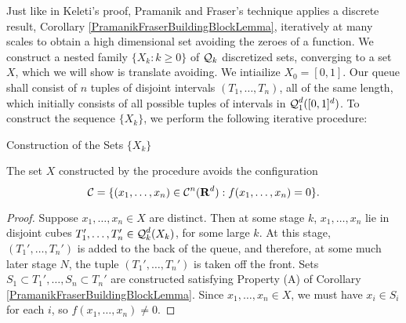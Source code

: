 Just like in Keleti's proof, Pramanik and Fraser's technique applies a discrete result, Corollary \ref{PramanikFraserBuildingBlockLemma}, iteratively at many scales to obtain a high dimensional set avoiding the zeroes of a function. We construct a nested family $\{ X_k : k \geq 0 \}$ of $\operatorname{\mathcal{Q}}_k$ discretized sets, converging to a set $X$, which we will show is translate avoiding. We intiailize $X_0 = [0,1]$. Our queue shall consist of $n$ tuples of disjoint intervals $(T_1, \dots, T_n)$, all of the same length, which initially consists of all possible tuples of intervals in $\operatorname{\mathcal{Q}}_1^d([0,1]^d)$. To construct the sequence $\{ X_k \}$, we perform the following iterative procedure:
%
\begin{algorithm}[H]
    \begin{algorithmic}
        \caption{Construction of the Sets $\{ X_k \}$}
        \MRepeat
        \EndRepeat   
    \end{algorithmic}
\end{algorithm}

\begin{lemma}
    The set $X$ constructed by the procedure avoids the configuration
    \[ \operatorname{\mathcal{C}} = \{ (x_1, \dots, x_n) \in \operatorname{\mathcal{C}}^n(\operatorname{\mathbf{R}}^d) : f(x_1, \dots, x_n) = 0 \}. \]
\end{lemma}
\begin{proof}
Suppose $x_1, \dots, x_n \in X$ are distinct. Then at some stage $k$, $x_1, \dots, x_n$ lie in disjoint cubes $T_1', \dots, T_n' \in \operatorname{\mathcal{Q}}_k^d(X_k)$, for some large $k$. At this stage, $(T_1', \dots, T_n')$ is added to the back of the queue, and therefore, at some much later stage $N$, the tuple $(T_1', \dots, T_n')$ is taken off the front. Sets $S_1 \subset T_1', \dots, S_n \subset T_n'$ are constructed satisfying Property (A) of Corollary \ref{PramanikFraserBuildingBlockLemma}. Since $x_1, \dots, x_n \in X$, we must have $x_i \in S_i$ for each $i$, so $f(x_1, \dots, x_n) \neq 0$.
\end{proof}

